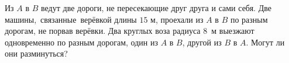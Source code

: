 \documentclass[a4paper,11pt]{article}
\begin{document}


Из $A$ в $B$ ведут две дороги,
не пересекающие друг друга и сами себя.
Две машины,~\hbox{связанные}~ве\-р\"ев\-кой длины $15$ м,
проехали из $A$ в $B$ по разным дорогам,
не порвав вер\"евки.
Два круглых воза радиуса $8$~м
выезжают одновременно по разным дорогам, один из $A$ в $B$,
другой из $B$ в $A$. %
Могут ли они разминуться?

\vspace*{-1mm}


\end{document}
